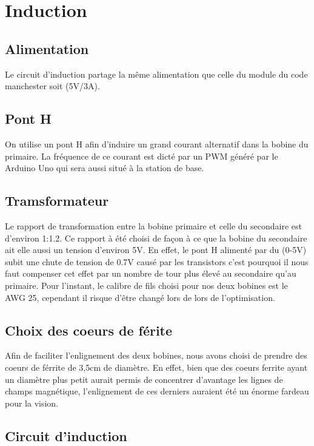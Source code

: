 \section{Induction}
\subsection{Alimentation}
Le circuit d'induction partage la même alimentation que celle du module du code manchester soit (5V/3A).
\subsection{Pont H}
On utilise un pont H afin d'induire un grand courant alternatif dans la bobine du primaire. La fréquence de ce courant est dicté par un PWM généré par le Arduino Uno qui sera aussi situé à la station de base.

\subsection{Tramsformateur}
Le rapport de transformation entre la bobine primaire et celle du secondaire est d'environ 1:1.2. Ce rapport à été choisi de façon à ce que la bobine du secondaire ait elle aussi un tension d'environ 5V.
En effet, le pont H alimenté par du (0-5V) subit une chute de tension de 0.7V causé par les transistors c'est pourquoi il nous faut compenser cet effet par un nombre de tour plus élevé au secondaire
qu'au primaire. Pour l'instant, le calibre de fils choisi pour nos deux bobines est le AWG 25, cependant il risque d'être changé lors de lors de l'optimisation.
\subsection{Choix des coeurs de férite}
Afin de faciliter l'enlignement des deux bobines, nous avons choisi de prendre des coeurs de férrite de 3,5cm de diamètre.
En effet, bien que des coeurs ferrite ayant un diamètre plus petit aurait permis de concentrer d'avantage les lignes de champs magnétique, l'enlignement de ces derniers auraient été un énorme fardeau pour
la vision.


\subsection{Circuit d'induction}


